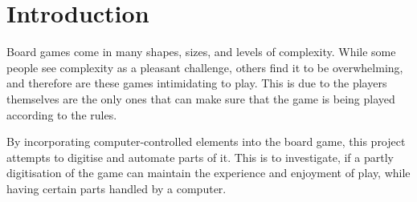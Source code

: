 \chapter{Introduction}\label{ch:introduction}

Board games come in many shapes, sizes, and levels of complexity. While some people see complexity as a pleasant challenge, others find it to be overwhelming, and therefore are these games intimidating to play. This is due to the players themselves are the only ones that can make sure that the game is being played according to the rules.

By incorporating computer-controlled elements into the board game, this project attempts to digitise and automate parts of it. This is to investigate, if a partly digitisation of the game can maintain the experience and enjoyment of play, while having certain parts handled by a computer.



